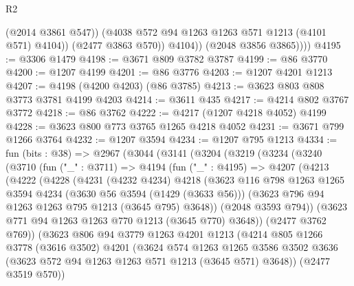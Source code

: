 \begin{lexlean}{R2}
\begin{coremodule}
                    (@2014 @3861 @547))
                  (@4038 @572 @94 @1263 @1263 @571 @1213 (@4101 @571) @4104))
                (@2477 @3863 @570))
              @4104))
          (@2048 @3856 @3865))))
@4195 := @3306 @1479
@4198 := @3671 @809 @3782 @3787
@4199 := @86 @3770
@4200 := @1207 @4199
@4201 := @86 @3776
@4203 := @1207 @4201 @1213
@4207 := @4198 (@4200 @4203) (@86 @3785)
@4213 := @3623 @803 @808 @3773 @3781 @4199 @4203
@4214 := @3611 @435
@4217 := @4214 @802 @3767 @3772
@4218 := @86 @3762
@4222 := @4217 (@1207 @4218 @4052) @4199
@4228 := @3623 @800 @773 @3765 @1265 @4218 @4052
@4231 := @3671 @799 @1266 @3764
@4232 := @1207 @3594
@4234 := @1207 @795 @1213
@4334 := fun (bits : @38) =>
  @2967
    (@3044
      (@3141
        (@3204
          (@3219
            (@3234
              (@3240
                (@3710
                  (fun ("_" : @3711) =>
                  @4194
                    (fun ("_" : @4195) =>
                    @4207
                      (@4213
                        (@4222
                          (@4228
                            (@4231
                              (@4232 @4234)
                              @4218
                              (@3623
                                @116
                                @798
                                @1263
                                @1265
                                @3594
                                @4234
                                (@3630 @56 @3594 (@1429 (@3633 @56)))
                                (@3623 @796 @94 @1263 @1263 @795 @1213 (@3645 @795) @3648))
                              (@2048 @3593 @794))
                            (@3623 @771 @94 @1263 @1263 @770 @1213 (@3645 @770) @3648))
                          (@2477 @3762 @769))
                        (@3623
                          @806
                          @94
                          @3779
                          @1263
                          @4201
                          @1213
                          (@4214
                            @805
                            @1266
                            @3778
                            (@3616 @3502)
                            @4201
                            (@3624
                              @574
                              @1263
                              @1265
                              @3586
                              @3502
                              @3636
                              (@3623 @572 @94 @1263 @1263 @571 @1213 (@3645 @571) @3648))
                            (@2477 @3519 @570))

\end{coremodule}
\end{lexlean}
